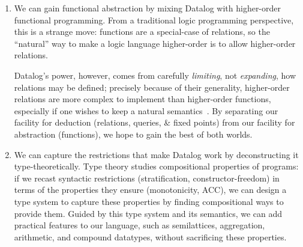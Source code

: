 \begin{enumerate}
\item We can gain functional abstraction by mixing Datalog with higher-order
  functional programming. From a traditional logic programming perspective, this
  is a strange move: functions are a special-case of relations, so the
  ``natural'' way to make a logic language higher-order is to allow higher-order
  relations.

  Datalog's power, however, comes from carefully \emph{limiting}, not
  \emph{expanding}, how relations may be defined; precisely because of their
  generality, higher-order relations are more complex to implement than
  higher-order functions, especially if one wishes to keep a natural
  semantics~\citep{hopes}. By separating our facility for deduction
  (relations, queries, \& fixed points) from our facility for abstraction
  (functions), we hope to gain the best of both worlds.


\item We can capture the restrictions that make Datalog work by deconstructing
  it type-theoretically. Type theory studies compositional properties of
  programs: if we recast syntactic restrictions (stratification,
  constructor-freedom) in terms of the properties they ensure (monotonicity,
  ACC), we can design a type system to capture these properties by finding
  compositional ways to provide them.
%
  Guided by this type system and its semantics, we can add practical
  features to our language, such as semilattices, aggregation, arithmetic, and
  compound datatypes, without sacrificing these properties.


\end{enumerate}
